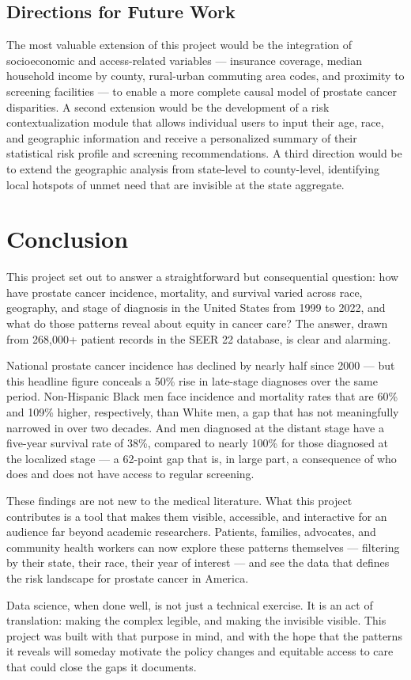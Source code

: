 \documentclass[12pt]{article}
\begin{document}
\subsection{Directions for Future Work}

The most valuable extension of this project would be the integration of
socioeconomic and access-related variables --- insurance coverage, median household
income by county, rural-urban commuting area codes, and proximity to screening
facilities --- to enable a more complete causal model of prostate cancer disparities.
A second extension would be the development of a risk contextualization module that
allows individual users to input their age, race, and geographic information and
receive a personalized summary of their statistical risk profile and screening
recommendations. A third direction would be to extend the geographic analysis from
state-level to county-level, identifying local hotspots of unmet need that are
invisible at the state aggregate.

\section{Conclusion}

This project set out to answer a straightforward but consequential question: how
have prostate cancer incidence, mortality, and survival varied across race,
geography, and stage of diagnosis in the United States from 1999 to 2022, and what
do those patterns reveal about equity in cancer care? The answer, drawn from
268,000+ patient records in the SEER 22 database, is clear and alarming.

National prostate cancer incidence has declined by nearly half since 2000 --- but
this headline figure conceals a 50\% rise in late-stage diagnoses over the same
period. Non-Hispanic Black men face incidence and mortality rates that are 60\% and
109\% higher, respectively, than White men, a gap that has not meaningfully narrowed
in over two decades. And men diagnosed at the distant stage have a five-year survival
rate of 38\%, compared to nearly 100\% for those diagnosed at the localized stage ---
a 62-point gap that is, in large part, a consequence of who does and does not have
access to regular screening.

These findings are not new to the medical literature. What this project contributes
is a tool that makes them visible, accessible, and interactive for an audience far
beyond academic researchers. Patients, families, advocates, and community health
workers can now explore these patterns themselves --- filtering by their state, their
race, their year of interest --- and see the data that defines the risk landscape for
prostate cancer in America.

Data science, when done well, is not just a technical exercise. It is an act of
translation: making the complex legible, and making the invisible visible. This
project was built with that purpose in mind, and with the hope that the patterns it
reveals will someday motivate the policy changes and equitable access to care that
could close the gaps it documents.

\newpage
\singlespacing


\end{document}
